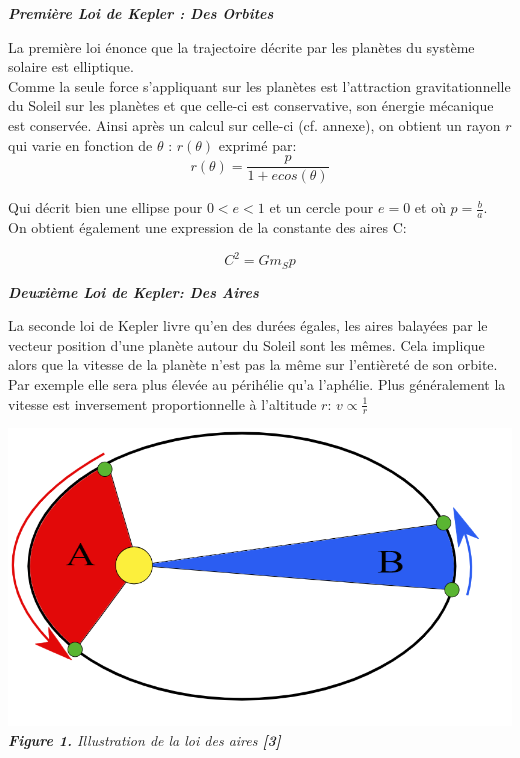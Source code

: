 \documentclass{aa}
\begin{document}
\begin{flushleft}
\textit{\textbf{Première Loi de Kepler : Des Orbites}} \\    
\end{flushleft}
La première loi énonce que la trajectoire décrite par les planètes du système solaire est elliptique. \\
Comme la seule force s'appliquant sur les planètes est l'attraction gravitationnelle du Soleil sur les planètes et que celle-ci est conservative, son énergie mécanique est conservée. Ainsi après un calcul sur celle-ci (cf. annexe), on obtient un rayon $r$ qui varie en fonction de $\theta$ : $r(\theta)$ exprimé par: \\

\begin{equation}
    r(\theta) = \frac{p}{1 + ecos(\theta)}
\end{equation}

Qui décrit bien une ellipse pour $0 < e < 1$ et un cercle pour $e=0$ et où $p = \frac{b}{a}$. \\

On obtient également une expression de la constante des aires C: 

\begin{equation}
    C^{2} = Gm_Sp 
\end{equation}


\begin{flushleft}
\textit{\textbf{Deuxième Loi de Kepler: Des Aires}} \\    
\end{flushleft}

La seconde loi de Kepler livre qu'en des durées égales, les aires balayées par le vecteur position d'une planète autour du Soleil sont les mêmes. Cela implique alors que la vitesse de la planète n'est pas la même sur l'entièreté de son orbite. Par exemple elle sera plus élevée au périhélie qu'a l'aphélie. Plus généralement la vitesse est inversement proportionnelle à l'altitude $r$: $v \propto \frac{1}{r}$

\begin{center}
    \includegraphics[scale = 0.4]{images/loi des aires.png} \\
    \emph{\textbf{Figure 1.} Illustration de la loi des aires \textbf{[3]}}
\end{center}
\end{document}
